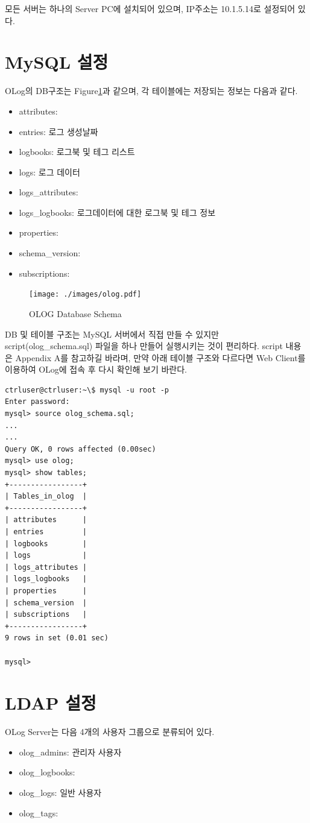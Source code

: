 \documentclass[11pt
  , a4paper
  , article
  , oneside
]{memoir}
\begin{document}
모든 서버는 하나의 Server PC에 설치되어 있으며, IP주소는 10.1.5.14로 설정되어 있다.

\section{MySQL 설정}
OLog의 DB구조는 Figure\ref{fig:olog_schema}과 같으며, 각 테이블에는 저장되는 정보는 다음과 같다.
\begin{itemize}
\item attributes:
\item entries: 로그 생성날짜
\item logbooks: 로그북 및 테그 리스트
\item logs: 로그 데이터
\item logs\_attributes:
\item logs\_logbooks: 로그데이터에 대한 로그북 및 테그 정보
\item properties:
\item schema\_version:
\item subscriptions:
\end{itemize}

\begin{figure}[!htb]
  \centering
  \texttt{[image: ./images/olog.pdf]}
  \caption{
            OLOG Database Schema
          }
  \label{fig:olog_schema}
\end{figure}

DB 및 테이블 구조는 MySQL 서버에서 직접 만들 수 있지만 
script(olog\_schema.sql) 파일을 하나 만들어 실행시키는 것이 편리하다.
script 내용은 Appendix A를 참고하길 바라며, 만약 아래 테이블 구조와
다르다면 Web Client를 이용하여 OLog에 접속 후 다시 확인해 보기 바란다.

\begin{lstlisting}[style=termstyle]
ctrluser@ctrluser:~\$ mysql -u root -p
Enter password:
mysql> source olog_schema.sql;
...
...
Query OK, 0 rows affected (0.00sec)
mysql> use olog;
mysql> show tables;
+-----------------+
| Tables_in_olog  |
+-----------------+
| attributes      |
| entries         |
| logbooks        |
| logs            |
| logs_attributes |
| logs_logbooks   |
| properties      |
| schema_version  |
| subscriptions   |
+-----------------+
9 rows in set (0.01 sec)

mysql>
\end{lstlisting}

\section{LDAP 설정}
OLog Server는 다음 4개의 사용자 그룹으로 분류되어 있다.
\begin{itemize}
\item olog\_admins: 관리자 사용자
\item olog\_logbooks:
\item olog\_logs: 일반 사용자
\item olog\_tags:
\end{itemize}
\end{document}
